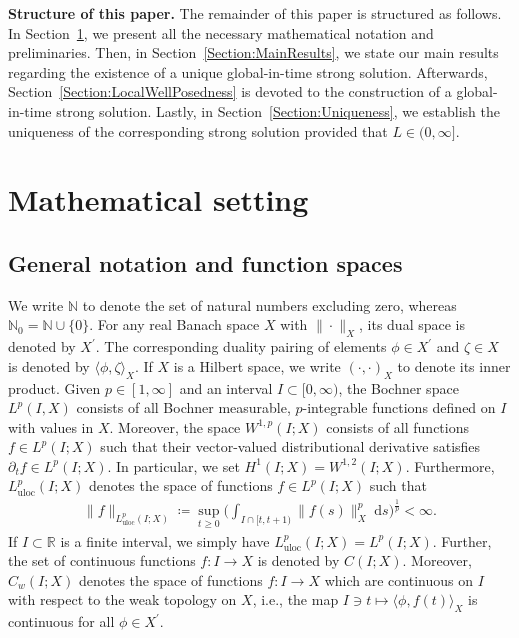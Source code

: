 \documentclass[10pt,reqno]{amsart}
\theoremstyle{remark}
\numberwithin{equation}{section}
\newcommand{\norm}[1]{\| #1 \|}
\newcommand{\ang}[2]{ \langle #1 , #2  \rangle}
\newcommand{\scp}[2]{ ( #1 , #2  )}
\newcommand{\R}{\mathbb R}
\newcommand{\N}{\mathbb N}
\newcommand{\ds}{\;\mathrm ds}
\newcommand{\delt}{\partial_{t}}
\begin{document}
\textbf{Structure of this paper.} The remainder of this paper is structured as follows. In Section~\ref{Section:MathematicalSetting}, we present all the necessary mathematical notation and preliminaries. Then, in Section~\ref{Section:MainResults}, we state our main results regarding the existence of a unique global-in-time strong solution. Afterwards, Section~\ref{Section:LocalWellPosedness} is devoted to the construction of a global-in-time strong solution. Lastly, in Section~\ref{Section:Uniqueness}, we establish the uniqueness of the corresponding strong solution provided that $L \in(0,\infty]$.

\medskip

\section{Mathematical setting}
\label{Section:MathematicalSetting}

\subsection{General notation and function spaces}

We write $\N$ to denote the set of natural numbers excluding zero, whereas $\N_0 = \N\cup\{0\}$. For any real Banach space $X$ with $\norm{\cdot}_X$, its dual space is denoted by $X^\prime$. The corresponding duality pairing of elements $\phi\in X^\prime$ and $\zeta\in X$ is denoted by $\ang{\phi}{\zeta}_X$. If $X$ is a Hilbert space, we write $\scp{\cdot}{\cdot}_X$ to denote its inner product. Given $p\in[1,\infty]$ and an interval $I\subset[0,\infty)$, the Bochner space $L^p(I,X)$ consists of all Bochner measurable, $p$-integrable functions defined on $I$ with values in $X$. Moreover, the space $W^{1,p}(I;X)$ consists of all functions $f\in L^p(I;X)$ such that their vector-valued distributional derivative satisfies $\delt f\in L^p(I;X)$. In particular, we set $H^1(I;X) = W^{1,2}(I;X)$. Furthermore, $L^p_{\mathrm{uloc}}(I;X)$ denotes the space of functions $f\in L^p(I;X)$ such that
\begin{align*}
    \norm{f}_{L^p_{\mathrm{uloc}}(I;X)} \coloneqq \sup_{t\geq 0}\Big(\int_{I\cap [t,t+1)} \norm{f(s)}_X^p\ds\Big)^{\frac1p} < \infty.
\end{align*}
If $I\subset\R$ is a finite interval, we simply have $L^p_{\mathrm{uloc}}(I;X) = L^p(I;X)$. Further, the set of continuous functions $f:I\rightarrow X$ is denoted by $C(I;X)$. Moreover, $C_w(I;X)$ denotes the space of functions $f:I\to X$ which are continuous on $I$ with respect to the weak topology on $X$, i.e., the map $I\ni t\mapsto \ang{\phi}{f(t)}_X$ is continuous for all $\phi\in X^\prime$.
\end{document}
